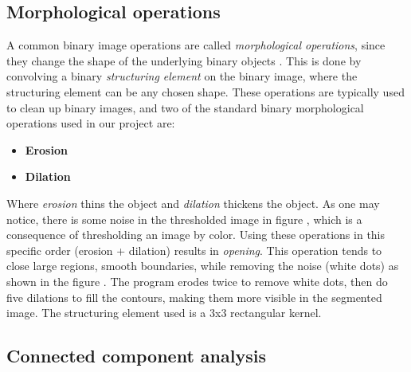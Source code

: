 \documentclass[USenglish]{ifimaster}  %
\begin{document}
\subsection{Morphological operations}
A common binary image operations are called \textit{morphological operations}, since
they change the shape of the underlying binary objects \cite{Ritter}. This is done by convolving a binary \textit{structuring element} on the binary image, where the structuring element can be any chosen shape. These operations are typically used to clean up binary images, and two of the standard binary morphological operations used in our project are: 
\begin{itemize}
    \item \textbf{Erosion}
    \item \textbf{Dilation}
\end{itemize}

Where \textit{erosion} thins the object and \textit{dilation} thickens the object. As one may notice, there is some noise in the thresholded image in figure , which is a consequence of thresholding an image by color. Using these operations in this specific order (erosion + dilation) results in \textit{opening}. This operation tends to close large regions, smooth boundaries, while removing the noise (white dots) as shown in the figure . The program erodes twice to remove white dots, then do five dilations to fill the contours, making them more visible in the segmented image. The structuring element used is a 3x3 rectangular kernel.
\subsection{Connected component analysis}
\end{document}
